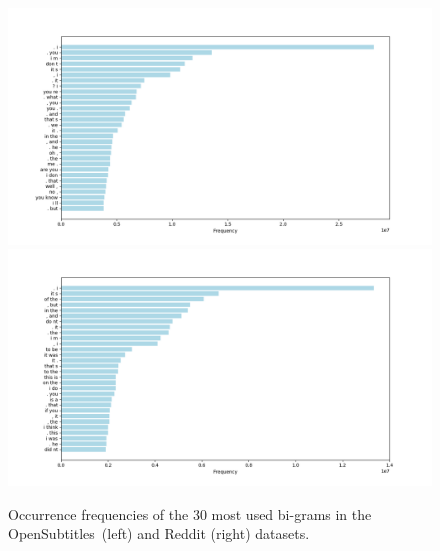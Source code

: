 \begin{figure}[H]
	\includegraphics[width=\linewidth]{img/opensubtitles_bigram_top_30_freq}
	\centering
	\small
	\endminipage\hfill
	\includegraphics[width=\linewidth]{img/reddit_bigram_top_30_freq}
	\centering
	\small
	\endminipage\hfill
	\caption{Occurrence frequencies of the 30 most used bi-grams in the OpenSubtitles~(left) and Reddit (right) datasets.}
	\label{data:ngram:freq_top_30}
\end{figure}


